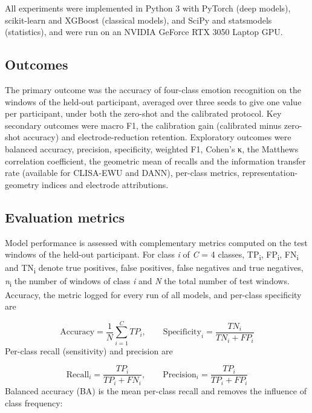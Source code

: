 All experiments were implemented in Python 3 with PyTorch (deep models), scikit-learn and XGBoost (classical models), and SciPy and statsmodels (statistics), and were run on an NVIDIA GeForce RTX 3050 Laptop GPU.


\subsection{Outcomes}
The primary outcome was the accuracy of four-class emotion recognition on the windows of the held-out participant, averaged over three seeds to give one value per participant, under both the zero-shot and the calibrated protocol. Key secondary outcomes were macro F1, the calibration gain (calibrated minus zero-shot accuracy) and electrode-reduction retention. Exploratory outcomes were balanced accuracy, precision, specificity, weighted F1, Cohen’s κ, the Matthews correlation coefficient, the geometric mean of recalls and the information transfer rate (available for CLISA-EWU and DANN), per-class metrics, representation-geometry indices and electrode attributions.


\subsection{Evaluation metrics}
Model performance is assessed with complementary metrics computed on the test windows of the held-out participant. For class \emph{i} of \emph{C} = 4 classes, TP\textsubscript{i}, FP\textsubscript{i}, FN\textsubscript{i} and TN\textsubscript{i} denote true positives, false positives, false negatives and true negatives, \emph{n}\textsubscript{i} the number of windows of class \emph{i} and \emph{N} the total number of test windows. Accuracy, the metric logged for every run of all models, and per-class specificity are

\begin{equation}
  \mathrm{Accuracy}=\frac{1}{N}\sum_{i=1}^{C}TP_i,\qquad \mathrm{Specificity}_i=\frac{TN_i}{TN_i+FP_i}
  \label{eq:acc}
\end{equation}
Per-class recall (sensitivity) and precision are

\begin{equation}
  \mathrm{Recall}_i=\frac{TP_i}{TP_i+FN_i},\qquad \mathrm{Precision}_i=\frac{TP_i}{TP_i+FP_i}
  \label{eq:recall}
\end{equation}
Balanced accuracy (BA) is the mean per-class recall\cite{brodersen} and removes the influence of class frequency:

